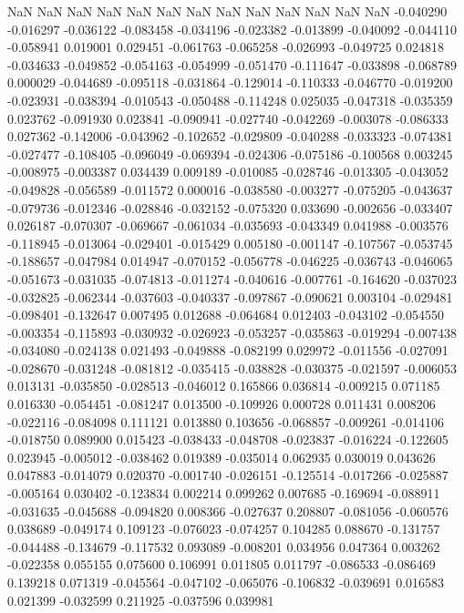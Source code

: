 NaN
NaN
NaN
NaN
NaN
NaN
NaN
NaN
NaN
NaN
NaN
NaN
NaN
-0.040290
-0.016297
-0.036122
-0.083458
-0.034196
-0.023382
-0.013899
-0.040092
-0.044110
-0.058941
0.019001
0.029451
-0.061763
-0.065258
-0.026993
-0.049725
0.024818
-0.034633
-0.049852
-0.054163
-0.054999
-0.051470
-0.111647
-0.033898
-0.068789
0.000029
-0.044689
-0.095118
-0.031864
-0.129014
-0.110333
-0.046770
-0.019200
-0.023931
-0.038394
-0.010543
-0.050488
-0.114248
0.025035
-0.047318
-0.035359
0.023762
-0.091930
0.023841
-0.090941
-0.027740
-0.042269
-0.003078
-0.086333
0.027362
-0.142006
-0.043962
-0.102652
-0.029809
-0.040288
-0.033323
-0.074381
-0.027477
-0.108405
-0.096049
-0.069394
-0.024306
-0.075186
-0.100568
0.003245
-0.008975
-0.003387
0.034439
0.009189
-0.010085
-0.028746
-0.013305
-0.043052
-0.049828
-0.056589
-0.011572
0.000016
-0.038580
-0.003277
-0.075205
-0.043637
-0.079736
-0.012346
-0.028846
-0.032152
-0.075320
0.033690
-0.002656
-0.033407
0.026187
-0.070307
-0.069667
-0.061034
-0.035693
-0.043349
0.041988
-0.003576
-0.118945
-0.013064
-0.029401
-0.015429
0.005180
-0.001147
-0.107567
-0.053745
-0.188657
-0.047984
0.014947
-0.070152
-0.056778
-0.046225
-0.036743
-0.046065
-0.051673
-0.031035
-0.074813
-0.011274
-0.040616
-0.007761
-0.164620
-0.037023
-0.032825
-0.062344
-0.037603
-0.040337
-0.097867
-0.090621
0.003104
-0.029481
-0.098401
-0.132647
0.007495
0.012688
-0.064684
0.012403
-0.043102
-0.054550
-0.003354
-0.115893
-0.030932
-0.026923
-0.053257
-0.035863
-0.019294
-0.007438
-0.034080
-0.024138
0.021493
-0.049888
-0.082199
0.029972
-0.011556
-0.027091
-0.028670
-0.031248
-0.081812
-0.035415
-0.038828
-0.030375
-0.021597
-0.006053
0.013131
-0.035850
-0.028513
-0.046012
0.165866
0.036814
-0.009215
0.071185
0.016330
-0.054451
-0.081247
0.013500
-0.109926
0.000728
0.011431
0.008206
-0.022116
-0.084098
0.111121
0.013880
0.103656
-0.068857
-0.009261
-0.014106
-0.018750
0.089900
0.015423
-0.038433
-0.048708
-0.023837
-0.016224
-0.122605
0.023945
-0.005012
-0.038462
0.019389
-0.035014
0.062935
0.030019
0.043626
0.047883
-0.014079
0.020370
-0.001740
-0.026151
-0.125514
-0.017266
-0.025887
-0.005164
0.030402
-0.123834
0.002214
0.099262
0.007685
-0.169694
-0.088911
-0.031635
-0.045688
-0.094820
0.008366
-0.027637
0.208807
-0.081056
-0.060576
0.038689
-0.049174
0.109123
-0.076023
-0.074257
0.104285
0.088670
-0.131757
-0.044488
-0.134679
-0.117532
0.093089
-0.008201
0.034956
0.047364
0.003262
-0.022358
0.055155
0.075600
0.106991
0.011805
0.011797
-0.086533
-0.086469
0.139218
0.071319
-0.045564
-0.047102
-0.065076
-0.106832
-0.039691
0.016583
0.021399
-0.032599
0.211925
-0.037596
0.039981
